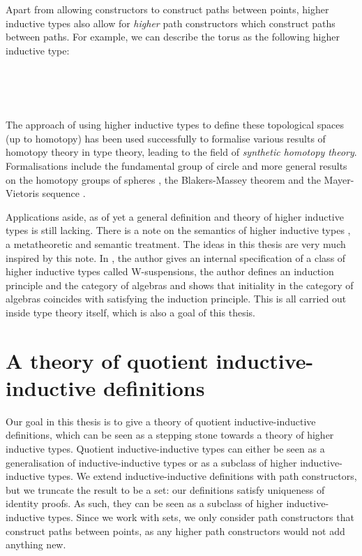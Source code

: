 Apart from allowing constructors to construct paths between points,
higher inductive types also allow for \emph{higher} path constructors
which construct paths between paths. For example, we can describe the
torus as the following higher inductive type:
%
\begin{datatype}{\torusty}{\Type}
  \constr{\torusbase}{\torusty} \\
  \constr{\torusp}{\torusbase = \torusbase} \\
  \constr{\torusq}{\torusbase = \torusbase} \\
  \constr{\torusr}{\torusp \ct \torusq = \torusq \ct \torusp}
\end{datatype}
%
The approach of using higher inductive types to define these
topological spaces (up to homotopy) has been used successfully to
formalise various results of homotopy theory in type theory, leading
to the field of \emph{synthetic homotopy theory}. Formalisations
include the fundamental group of circle \cite{Licata2013} and more
general results on the homotopy groups of spheres
\cite{Licata2013ii,Brunerie2016}, the Blakers-Massey theorem
\cite{Favonia2016} and the Mayer-Vietoris sequence \cite{Cavallo2015}.

Applications aside, as of yet a general definition and theory of
higher inductive types is still lacking. There is a note on the
semantics of higher inductive types \cite{Lumsdaine2013}, \ie a
metatheoretic and semantic treatment. The ideas in this thesis are
very much inspired by this note. In \cite{Sojakova2014}, the author
gives an internal specification of a class of higher inductive types
called W-suspensions, \ie the author defines an induction principle
and the category of algebras and shows that initiality in the category
of algebras coincides with satisfying the induction principle. This is
all carried out inside type theory itself, which is also a goal of
this thesis.

\section{A theory of quotient inductive-inductive definitions}

Our goal in this thesis is to give a theory of quotient
inductive-inductive definitions, which can be seen as a stepping stone
towards a theory of higher inductive types. Quotient
inductive-inductive types can either be seen as a generalisation of
inductive-inductive types or as a subclass of higher
inductive-inductive types. We extend inductive-inductive definitions
with path constructors, but we truncate the result to be a set: our
definitions satisfy uniqueness of identity proofs. As such, they can
be seen as a subclass of higher inductive-inductive types. Since we
work with sets, we only consider path constructors that construct
paths between points, as any higher path constructors would not add
anything new.

